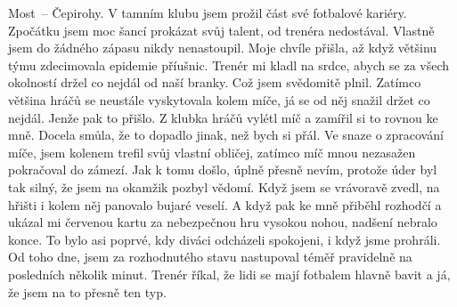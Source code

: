 
Most~-- Čepirohy. V tamním klubu jsem prožil část své fotbalové
kariéry. Zpočátku jsem moc šancí prokázat svůj talent, od trenéra
nedostával. Vlastně jsem do žádného zápasu nikdy nenastoupil. Moje
chvíle přišla, až když většinu týmu zdecimovala epidemie příušnic.
Trenér mi kladl na srdce, abych se za všech okolností držel co nejdál
od naší branky. Což jsem svědomitě plnil. Zatímco většina hráčů se
neustále vyskytovala kolem míče, já se od něj snažil držet co nejdál.
Jenže pak to přišlo. Z klubka hráčů vylétl míč a zamířil si to rovnou
ke mně. Docela smůla, že to dopadlo jinak, než bych si přál. Ve snaze
o zpracování míče, jsem kolenem trefil svůj vlastní obličej, zatímco
míč mnou nezasažen pokračoval do zámezí. Jak k tomu došlo, úplně
přesně nevím, protože úder byl tak silný, že jsem na okamžik pozbyl
vědomí. Když jsem se vrávoravě zvedl, na hřišti i kolem něj panovalo
bujaré veselí. A když pak ke mně přiběhl rozhodčí a ukázal mi červenou
kartu za nebezpečnou hru vysokou nohou, nadšení nebralo konce. To bylo
asi poprvé, kdy diváci odcházeli spokojeni, i když jsme prohráli. Od
toho dne, jsem za rozhodnutého stavu nastupoval téměř pravidelně na
posledních několik minut. Trenér říkal, že lidi se mají fotbalem
hlavně bavit a já, že jsem na to přesně ten typ.


